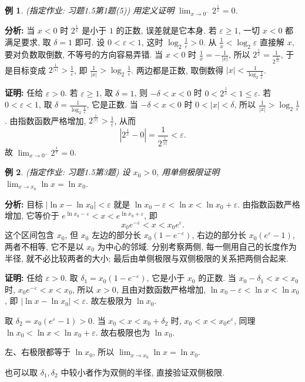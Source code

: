 \documentclass[UTF8,openany]{ctexbook}
\theoremstyle{chinesetextbook}
\newtheorem{example}{例}[section]
\newenvironment{cnproof}{\par\indent\textbf{证明:} \ignorespaces}{\par}
\begin{document}
\begin{example}\label{ex:h15-1-5}
\textnormal{(指定作业: 习题1.5第1题(5))} 用定义证明 $\displaystyle\lim_{x\to0^-}2^{\frac1x}=0$.
\end{example}
\par\indent\textbf{分析:} 当 $x<0$ 时 $2^{\frac1x}$ 是小于 $1$ 的正数, 误差就是它本身. 若 $\varepsilon\ge1$, 一切 $x<0$ 都满足要求, 取 $\delta=1$ 即可. 设 $0<\varepsilon<1$, 这时 $\displaystyle\log_2\frac1\varepsilon>0$. 从 $\displaystyle\frac1x<\log_2\varepsilon$ 直接解 $x$, 要对负数取倒数, 不等号的方向容易弄错. 当 $x<0$ 时 $\displaystyle\frac1x=-\frac1{|x|}$, 所以 $\displaystyle2^{\frac1x}=\frac1{2^{\frac1{|x|}}}$, 于是目标变成 $\displaystyle2^{\frac1{|x|}}>\frac1\varepsilon$, 即 $\displaystyle\frac1{|x|}>\log_2\frac1\varepsilon$. 两边都是正数, 取倒数得 $\displaystyle|x|<\frac1{\log_2\frac1\varepsilon}$.
\begin{cnproof}
任给 $\varepsilon>0$. 若 $\varepsilon\ge1$, 取 $\delta=1$, 则 $-\delta<x<0$ 时 $0<2^{\frac1x}<1\le\varepsilon$. 若 $0<\varepsilon<1$, 取 $\displaystyle\delta=\frac1{\log_2\frac1\varepsilon}$, 它是正数. 当 $-\delta<x<0$ 时 $0<|x|<\delta$, 所以 $\displaystyle\frac1{|x|}>\log_2\frac1\varepsilon$. 由指数函数严格增加, $\displaystyle2^{\frac1{|x|}}>\frac1\varepsilon$, 从而
\[
\left|2^{\frac1x}-0\right|=\frac1{2^{\frac1{|x|}}}<\varepsilon.
\]
故 $\displaystyle\lim_{x\to0^-}2^{\frac1x}=0$.
\end{cnproof}
\begin{example}\label{ex:h15-3}
\textnormal{(指定作业: 习题1.5第3题)} 设 $x_0>0$, 用单侧极限证明 $\displaystyle\lim_{x\to x_0}\ln x=\ln x_0$.
\end{example}
\par\indent\textbf{分析:} 目标 $|\ln x-\ln x_0|<\varepsilon$ 就是 $\ln x_0-\varepsilon<\ln x<\ln x_0+\varepsilon$. 由指数函数严格增加, 它等价于 $e^{\ln x_0-\varepsilon}<x<e^{\ln x_0+\varepsilon}$, 即
\[
x_0e^{-\varepsilon}<x<x_0e^{\varepsilon}.
\]
这个区间包含 $x_0$, 但 $x_0$ 左边的部分长 $x_0(1-e^{-\varepsilon})$, 右边的部分长 $x_0(e^\varepsilon-1)$, 两者不相等, 它不是以 $x_0$ 为中心的邻域. 分别考察两侧, 每一侧用自己的长度作为半径, 就不必比较两者的大小; 最后由单侧极限与双侧极限的关系把两侧合起来.
\begin{cnproof}
任给 $\varepsilon>0$. 取 $\delta_1=x_0(1-e^{-\varepsilon})$, 它是小于 $x_0$ 的正数. 当 $x_0-\delta_1<x<x_0$ 时, $x_0e^{-\varepsilon}<x<x_0$, 所以 $x>0$, 且由对数函数严格增加, $\ln x_0-\varepsilon<\ln x<\ln x_0$, 即 $|\ln x-\ln x_0|<\varepsilon$. 故左极限为 $\ln x_0$.

取 $\delta_2=x_0(e^{\varepsilon}-1)>0$. 当 $x_0<x<x_0+\delta_2$ 时, $x_0<x<x_0e^{\varepsilon}$, 同理 $\ln x_0<\ln x<\ln x_0+\varepsilon$. 故右极限也为 $\ln x_0$.

左、右极限都等于 $\ln x_0$, 所以 $\displaystyle\lim_{x\to x_0}\ln x=\ln x_0$.
\end{cnproof}
也可以取 $\delta_1,\delta_2$ 中较小者作为双侧的半径, 直接验证双侧极限.
\end{document}
